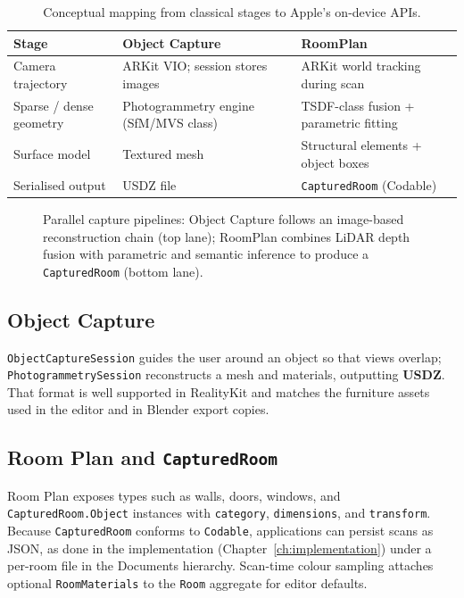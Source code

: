 \begin{table}[htbp]
\centering
\caption{Conceptual mapping from classical stages to Apple's on-device APIs.}
\label{tab:pipeline_to_api}
\begin{tabular}{|l|p{}|p{}|}
\hline
\textbf{Stage} & \textbf{Object Capture} & \textbf{RoomPlan} \\
\hline
Camera trajectory & ARKit VIO; session stores images & ARKit world tracking during scan \\
\hline
Sparse / dense geometry & Photogrammetry engine (SfM/MVS class) & TSDF-class fusion + parametric fitting \\
\hline
Surface model & Textured mesh & Structural elements + object boxes \\
\hline
Serialised output & USDZ file & \texttt{CapturedRoom} (Codable) \\
\hline
\end{tabular}
\end{table}

\begin{figure}[H]
\centering
{}
\caption{Parallel capture pipelines: Object Capture follows an image-based reconstruction chain (top lane); RoomPlan combines LiDAR depth fusion with parametric and semantic inference to produce a \texttt{CapturedRoom} (bottom lane).}
\label{fig:capture_branches}
\end{figure}

\subsection{Object Capture}

\texttt{ObjectCaptureSession} guides the user around an object so that views overlap; \texttt{PhotogrammetrySession} reconstructs a mesh and materials, outputting \textbf{USDZ}. That format is well supported in RealityKit and matches the furniture assets used in the editor and in Blender export copies.

\subsection{Room Plan and \texttt{CapturedRoom}}

Room Plan exposes types such as walls, doors, windows, and \texttt{CapturedRoom.Object} instances with \texttt{category}, \texttt{dimensions}, and \texttt{transform}. Because \texttt{CapturedRoom} conforms to \texttt{Codable}, applications can persist scans as JSON, as done in the implementation (Chapter~\ref{ch:implementation}) under a per-room file in the Documents hierarchy. Scan-time colour sampling attaches optional \texttt{RoomMaterials} to the \texttt{Room} aggregate for editor defaults.

